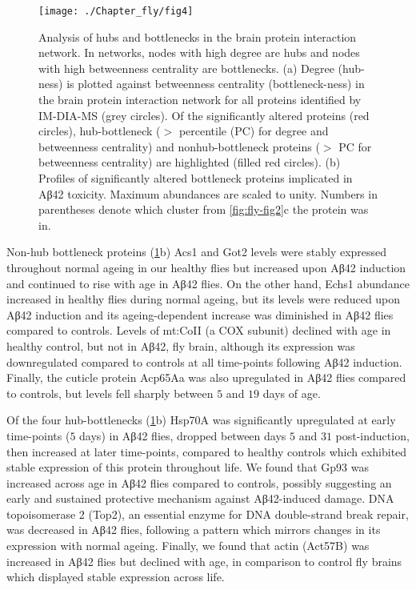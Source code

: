 \begin{figure}[!hbt]
    \centering
    \texttt{[image: ./Chapter\_fly/fig4]}
    \caption{%
        Analysis of hubs and bottlenecks in the brain protein interaction network.
        In networks, nodes with high degree are hubs and nodes with high
        betweenness centrality are bottlenecks.
        (a) Degree (hub-ness) is plotted against betweenness centrality (bottleneck-ness)
        in the brain protein interaction network for all proteins identified by
        IM-DIA-MS (grey circles).
        Of the significantly altered proteins (red circles),
        hub-bottleneck ($>$  percentile (PC) for degree and betweenness centrality) and
        nonhub-bottleneck proteins ($>$  PC for betweenness centrality) are highlighted
        (filled red circles).
        (b) Profiles of significantly altered bottleneck proteins implicated in Aβ42 toxicity.
        Maximum abundances are scaled to unity.
        Numbers in parentheses denote which cluster from \ref{fig:fly-fig2}c the protein was in.
    }
    \label{fig:fly-fig4}
\end{figure}

Non-hub bottleneck proteins (\ref{fig:fly-fig4}b) Acs1 and Got2 levels were
stably expressed throughout normal ageing in our healthy flies but increased upon
Aβ42 induction and continued to rise with age in Aβ42 flies.
On the other hand, Echs1 abundance increased in healthy flies during normal ageing,
but its levels were reduced upon Aβ42 induction and its ageing-dependent increase
was diminished in Aβ42 flies compared to controls.
Levels of mt:CoII (a COX subunit) declined with age in healthy control,
but not in Aβ42, fly brain, although its expression was downregulated compared to
controls at all time-points following Aβ42 induction.
Finally, the cuticle protein Acp65Aa was also upregulated in Aβ42 flies compared to controls,
but levels fell sharply between $5$ and $19$ days of age.

Of the four hub-bottlenecks (\ref{fig:fly-fig4}b) Hsp70A was significantly upregulated
at early time-points ($5$ days) in Aβ42 flies, dropped between days $5$ and $31$ post-induction,
then increased at later time-points, compared to healthy controls
which exhibited stable expression of this protein throughout life.
We found that Gp93 was increased across age in Aβ42 flies compared to controls,
possibly suggesting an early and sustained protective mechanism against Aβ42-induced damage.
DNA topoisomerase 2 (Top2), an essential enzyme for DNA double-strand break repair,
was decreased in Aβ42 flies, following a pattern which mirrors changes in its expression
with normal ageing.
Finally, we found that actin (Act57B) was increased in Aβ42 flies but declined with age,
in comparison to control fly brains which displayed stable expression across life.

